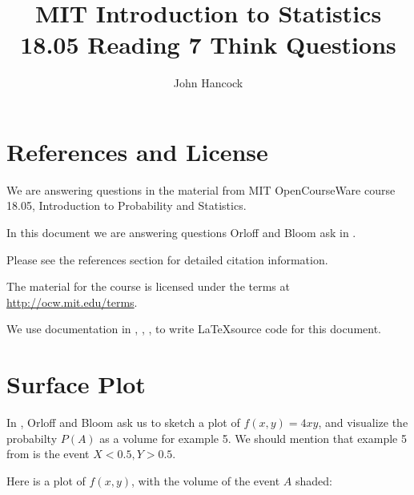 \documentclass[a4paper,11pt]{article}
\author{John Hancock}
\title{MIT Introduction to Statistics 18.05 Reading 7 Think Questions}
\begin{document}
\maketitle
\tableofcontents
\section{References and License}
We are answering questions in the material from MIT OpenCourseWare
course 18.05, Introduction to Probability and Statistics.

In this document we are answering questions Orloff and Bloom ask in
\cite{reading7}.

Please see the references section for detailed citation information.

The material for the course is licensed under the terms at
\url{http://ocw.mit.edu/terms}.

We use documentation in \cite{vennDiagram}, \cite{nodePos}, \cite{plotPoints},
\cite{plotFunc} to write \LaTeX source code for this document.
\section{Surface Plot}
In \cite{reading7}, Orloff and Bloom ask us
to sketch a plot of $f\left( x,y \right)
= 4xy$, and visualize the probabilty 
$P\left(A \right)$ as a volume for example
5.
We should mention that example 5 from
\cite{reading7} is the event 
$X < 0.5, Y > 0.5$.

Here is a plot of $f\left( x, y \right)$, 
with the volume of the event $A$ shaded:
\printbibliography{}
\end{document}
